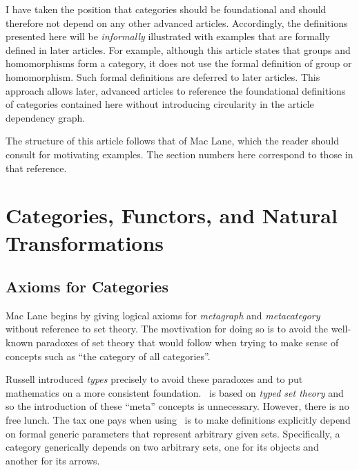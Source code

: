 \documentclass{amsart}
\begin{document}
I have taken the position that categories should be foundational and 
should therefore not depend on any other advanced articles.
Accordingly, the definitions presented here will be \emph{informally} illustrated with examples that are formally defined in
later articles.
For example, although this article states that groups and homomorphisms form a category, 
it does not use the formal definition of group or homomorphism.
Such formal definitions are deferred to later articles.
This approach allows later, advanced articles to reference the foundational definitions of categories 
contained here without introducing circularity in the article dependency graph.

The structure of this article follows that of Mac Lane\cite{maclane-cftwm},
which the reader should consult for motivating examples.
The section numbers here correspond to those in that reference.

\section{Categories, Functors, and Natural Transformations}

\subsection{Axioms for Categories}

Mac Lane\cite{maclane-cftwm} begins by giving logical axioms for \textit{metagraph} and \textit{metacategory} without reference to set theory.
The movtivation for doing so is to avoid the well-known paradoxes of set theory that would follow when trying to make sense of concepts such as 
``the category of all categories''.

Russell\cite[Appendix~B]{russell-tpom} introduced \textit{types} precisely to avoid these paradoxes 
and to put mathematics on a more consistent foundation.
 \ZN\ is based on \textit{typed set theory} and so the introduction of these ``meta'' concepts is unnecessary.
However, there is no free lunch.
The tax one pays when using \ZN\ is to make definitions explicitly depend on formal generic parameters that represent arbitrary given sets.
Specifically, a category generically depends on two arbitrary sets, one for its objects and another for its arrows.
\end{document}
